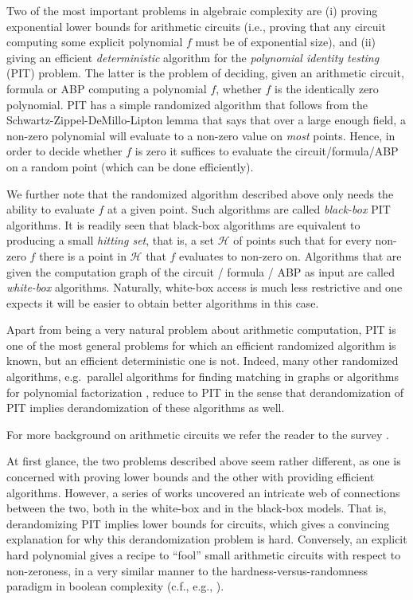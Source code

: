 \documentclass[11pt]{article}
\newcommand{\cH}{\mathcal{H}}
\begin{document}
Two of the most important problems in algebraic complexity are (i) proving exponential lower bounds for arithmetic circuits (i.e., proving that any circuit computing some explicit polynomial $f$ must be of exponential size), and (ii) giving an efficient {\em deterministic} algorithm for the {\em polynomial identity testing} (PIT) problem.
The latter is the problem of deciding, given an arithmetic circuit, formula or ABP computing a polynomial $f$, whether $f$ is the identically zero polynomial.
PIT has a simple randomized algorithm that follows from the Schwartz-Zippel-DeMillo-Lipton lemma \cite{S80, Z79, DL78} that says that over a large enough field, a non-zero polynomial will evaluate to a non-zero value on {\em most} points.
Hence, in order to decide whether $f$ is zero it suffices to evaluate the circuit/formula/ABP on a random point (which can be done efficiently).

We further note that the randomized algorithm described above only needs the ability to evaluate $f$ at a given point.
Such algorithms are called {\em black-box} PIT algorithms.
It is readily seen that black-box algorithms are equivalent to producing a small {\em hitting set}, that is, a set $\cH$ of points such that for every non-zero $f$ there is a point in $\cH$ that $f$ evaluates to non-zero on.
Algorithms that are given the computation graph of the circuit / formula / ABP as input are called {\em white-box} algorithms.
Naturally, white-box access is much less restrictive and one expects it will be easier to obtain better algorithms in this case.

Apart from being a very natural problem about arithmetic computation, PIT is one of the most general problems for which an efficient randomized algorithm is known, but an efficient deterministic one is not.
Indeed, many other randomized algorithms, e.g.\ parallel algorithms for finding matching in graphs \cite{KUW86, MVV87} or algorithms for polynomial factorization \cite{sv-icalp10, KSS15}, reduce to PIT in the sense that derandomization of PIT implies derandomization of these algorithms as well.

For more background on arithmetic circuits we refer the reader to the survey \cite{sy}.

\medskip

At first glance, the two problems described above seem rather different, as one is concerned with proving lower bounds and the other with providing efficient algorithms.
However, a series of works uncovered an intricate web of connections between the two, both in the white-box \cite{ki03, DSY09} and in the black-box \cite{HS80, a05} models.
That is, derandomizing PIT implies lower bounds for circuits, which gives a convincing explanation for why this derandomization problem is hard.  Conversely, an explicit hard polynomial gives a recipe to ``fool'' small arithmetic circuits with respect to non-zeroness, in a very similar manner to the hardness-versus-randomness paradigm in boolean complexity (c.f., e.g., \cite{nw94}).
\end{document}

